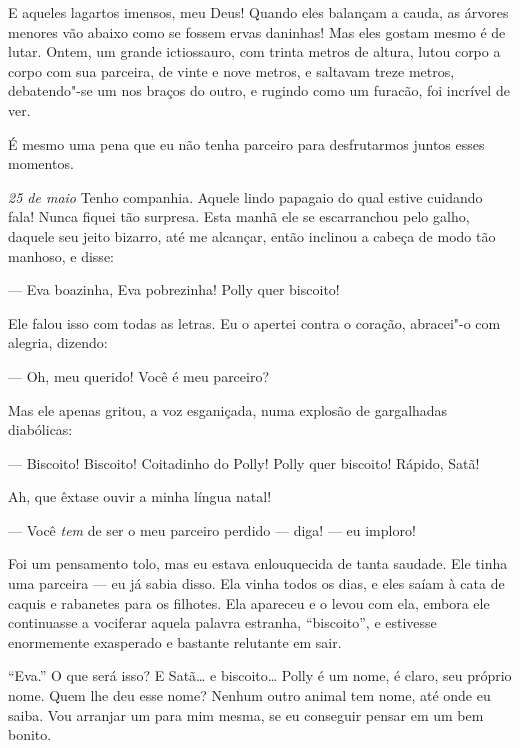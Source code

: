 E aqueles lagartos imensos, meu Deus! Quando eles balançam a cauda, as árvores menores vão abaixo como se fossem ervas daninhas!
Mas eles gostam mesmo é de lutar. Ontem, um grande ictiossauro, com trinta metros de altura, lutou corpo a corpo com sua parceira,
de vinte e nove metros, e saltavam treze metros, debatendo"-se um nos braços do outro, e rugindo como um furacão, foi incrível de ver.

É mesmo uma pena que eu não tenha parceiro para desfrutarmos juntos esses momentos.

\sectionitem

\textit{25 de maio} Tenho companhia. Aquele lindo papagaio do qual estive cuidando fala! Nunca fiquei tão surpresa. Esta manhã
ele se escarranchou pelo galho, daquele seu jeito bizarro, até me alcançar, então inclinou a cabeça de modo tão manhoso,
e disse:

--- Eva boazinha, Eva pobrezinha! Polly quer biscoito!     

Ele falou isso com todas as letras. Eu o apertei contra o coração, abracei"-o com alegria, dizendo:

--- Oh, meu querido! Você é meu parceiro?

Mas ele apenas gritou, a voz esganiçada, numa explosão de gargalhadas diabólicas:

--- Biscoito! Biscoito! Coitadinho do Polly! Polly quer biscoito! Rápido, Satã!

Ah, que êxtase ouvir a minha língua natal!

--- Você \textit{tem} de ser o meu parceiro perdido --- diga! --- eu imploro!

Foi um pensamento tolo, mas eu estava enlouquecida de tanta saudade. Ele tinha uma parceira ---
eu já sabia disso. Ela vinha todos os dias, e eles saíam à cata de caquis e rabanetes para os filhotes. Ela apareceu e
o levou com ela, embora ele continuasse a vociferar aquela palavra estranha, ``biscoito'', e estivesse enormemente exasperado e
bastante relutante em sair.

``Eva.'' O que será isso? E Satã\ldots{} e biscoito\ldots{} Polly é um nome, é claro, seu próprio nome. Quem lhe deu esse nome? Nenhum outro animal
tem nome, até onde eu saiba. Vou arranjar um para mim mesma, se eu conseguir pensar em um bem bonito.

